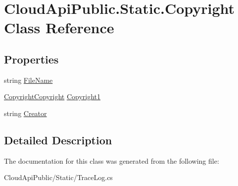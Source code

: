 \hypertarget{class_cloud_api_public_1_1_static_1_1_copyright}{\section{Cloud\-Api\-Public.\-Static.\-Copyright Class Reference}
\label{class_cloud_api_public_1_1_static_1_1_copyright}
}


 


\subsection*{Properties}
\begin{DoxyCompactItemize}
\item 
\hypertarget{class_cloud_api_public_1_1_static_1_1_copyright_a29c866f96cdfcc7b70a75925c1718061}{string \hyperlink{class_cloud_api_public_1_1_static_1_1_copyright_a29c866f96cdfcc7b70a75925c1718061}{File\-Name}}\label{class_cloud_api_public_1_1_static_1_1_copyright_a29c866f96cdfcc7b70a75925c1718061}

\begin{DoxyCompactList}\small\item\em \end{DoxyCompactList}\item 
\hypertarget{class_cloud_api_public_1_1_static_1_1_copyright_a62bc9e589f9bc3ccd43ba85f7b6f0187}{\hyperlink{namespace_cloud_api_public_1_1_static_a889ed6895b377efd7091a65ddb8cb3f0}{Copyright\-Copyright} \hyperlink{class_cloud_api_public_1_1_static_1_1_copyright_a62bc9e589f9bc3ccd43ba85f7b6f0187}{Copyright1}}\label{class_cloud_api_public_1_1_static_1_1_copyright_a62bc9e589f9bc3ccd43ba85f7b6f0187}

\begin{DoxyCompactList}\small\item\em \end{DoxyCompactList}\item 
\hypertarget{class_cloud_api_public_1_1_static_1_1_copyright_a45ba6181ad895d7c26fa0204c2a5dd5a}{string \hyperlink{class_cloud_api_public_1_1_static_1_1_copyright_a45ba6181ad895d7c26fa0204c2a5dd5a}{Creator}}\label{class_cloud_api_public_1_1_static_1_1_copyright_a45ba6181ad895d7c26fa0204c2a5dd5a}

\begin{DoxyCompactList}\small\item\em \end{DoxyCompactList}\end{DoxyCompactItemize}


\subsection{Detailed Description}


The documentation for this class was generated from the following file\-:\begin{DoxyCompactItemize}
\item 
Cloud\-Api\-Public/\-Static/Trace\-Log.\-cs\end{DoxyCompactItemize}
